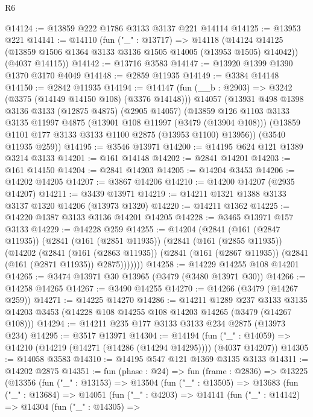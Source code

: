 \begin{lexlean}{R6}
\begin{coremodule}
@14124 := @13859 @222 @1786 @3133 @3137 @221 @14114
@14125 := @13953 @221
@14141 := @14110
    (fun ("_" : @13717) =>
    @14118
      (@14124 @14125 (@13859 @1506 @1364 @3133 @3136 @1505 @14005 (@13953 @1505) @14042))
      (@4037 @14115))
@14142 := @13716 @3583
@14147 := @13920 @1399 @1390 @1370 @3170 @4049
@14148 := @2859 @11935
@14149 := @3384 @14148
@14150 := @2842 @11935
@14194 := @14147
    (fun (__b : @2903) => @3242 (@3375 (@14149 @14150 @108) (@3376 @14148)))
    @14057
    (@13931
      @498
      @1398
      @3136
      @3133
      (@12875 @4875)
      (@2905 @14057)
      (@13859
        @126
        @1103
        @3133
        @3135
        @11997
        @4875
        (@13901 @108 @11997 (@3479 (@13904 @108)))
        (@13859 @1101 @177 @3133 @3133 @1100 @2875 (@13953 @1100) @13956))
      (@3540 @11935 @259))
@14195 := @3546 @13971
@14200 := @14195 @624 @121 @1389 @3214 @3133
@14201 := @161 @14148
@14202 := @2841 @14201
@14203 := @161 @14150
@14204 := @2841 @14203
@14205 := @14204 @3453
@14206 := @14202 @14205
@14207 := @3867 @14206
@14210 := @14200 @14207 (@2935 @14207)
@14211 := @3439 @13971
@14219 := @14211 @1321 @1388 @3133 @3137 @1320 @14206 (@13973 @1320)
@14220 := @14211 @1362
@14225 := @14220 @1387 @3133 @3136 @14201 @14205
@14228 := @3465 @13971 @157 @3133
@14229 := @14228 @259
@14255 := @14204
    (@2841
      (@161 (@2847 @11935))
      (@2841
        (@161 (@2851 @11935))
        (@2841
          (@161 (@2855 @11935))
          (@14202
            (@2841
              (@161 (@2863 @11935))
              (@2841 (@161 (@2867 @11935)) (@2841 (@161 (@2871 @11935)) @2875)))))))
@14258 := @14229 @14255 @108 @14201
@14265 := @3474 @13971 @30 @13965 (@3479 (@3480 @13971 @30))
@14266 := @14258 @14265
@14267 := @3490 @14255
@14270 := @14266 (@3479 (@14267 @259))
@14271 := @14225 @14270
@14286 := @14211
    @1289
    @237
    @3133
    @3135
    @14203
    @3453
    (@14228 @108 @14255 @108 @14203 @14265 (@3479 (@14267 @108)))
@14294 := @14211 @235 @177 @3133 @3133 @234 @2875 (@13973 @234)
@14295 := @3517 @13971
@14304 := @14194
    (fun ("_" : @14059) => @14210 (@14219 (@14271 (@14286 (@14294 @14295)))) (@4037 @14207))
@14305 := @14058 @3583
@14310 := @14195 @547 @121 @1369 @3135 @3133
@14311 := @14202 @2875
@14351 := fun (phase : @24) =>
  fun (frame : @2836) =>
  @13225
    (@13356
      (fun ("_" : @13153) =>
      @13504
        (fun ("_" : @13505) =>
        @13683
          (fun ("_" : @13684) =>
          @14051
            (fun ("_" : @4203) =>
            @14141
              (fun ("_" : @14142) =>
              @14304
                (fun ("_" : @14305) =>

\end{coremodule}
\end{lexlean}
